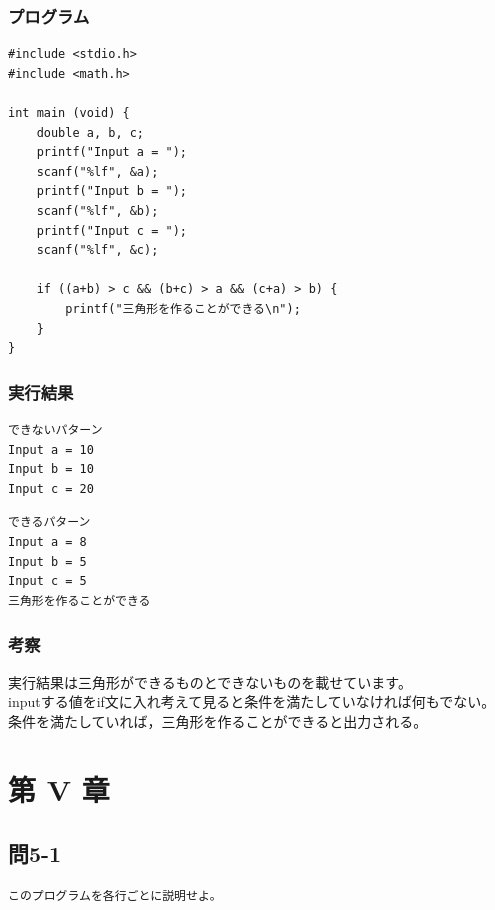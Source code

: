 \documentclass{jarticle}
\begin{document}
\subsubsection{プログラム\\}
\begin{breakbox}
\begin{verbatim}
#include <stdio.h>
#include <math.h>

int main (void) { 
    double a, b, c;
    printf("Input a = ");
    scanf("%lf", &a);
    printf("Input b = ");
    scanf("%lf", &b);
    printf("Input c = ");
    scanf("%lf", &c);

    if ((a+b) > c && (b+c) > a && (c+a) > b) {
        printf("三角形を作ることができる\n");
    }
}
\end{verbatim}
\end{breakbox}
\subsubsection{実行結果\\}
\begin{breakbox}
\begin{verbatim}
できないパターン
Input a = 10
Input b = 10
Input c = 20
\end{verbatim}
\end{breakbox}
\begin{breakbox}
\begin{verbatim}
できるパターン
Input a = 8       
Input b = 5
Input c = 5
三角形を作ることができる
\end{verbatim}
\end{breakbox}
\subsubsection{考察\\}
実行結果は三角形ができるものとできないものを載せています。\\
inputする値をif文に入れ考えて見ると条件を満たしていなければ何もでない。\\
条件を満たしていれば，三角形を作ることができると出力される。\\

\section{第 V 章\\}
\subsection{問5-1\\}
\begin{verbatim}
このプログラムを各行ごとに説明せよ。
\end{verbatim}
\end{document}
